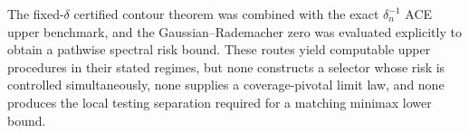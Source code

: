 The fixed-\(\delta\) certified contour theorem was combined with the exact \(\delta_n^{-1}\) ACE upper benchmark, and the Gaussian--Rademacher zero was evaluated explicitly to obtain a pathwise spectral risk bound.  These routes yield computable upper procedures in their stated regimes, but none constructs a selector whose risk is controlled simultaneously, none supplies a coverage-pivotal limit law, and none produces the local testing separation required for a matching minimax lower bound.